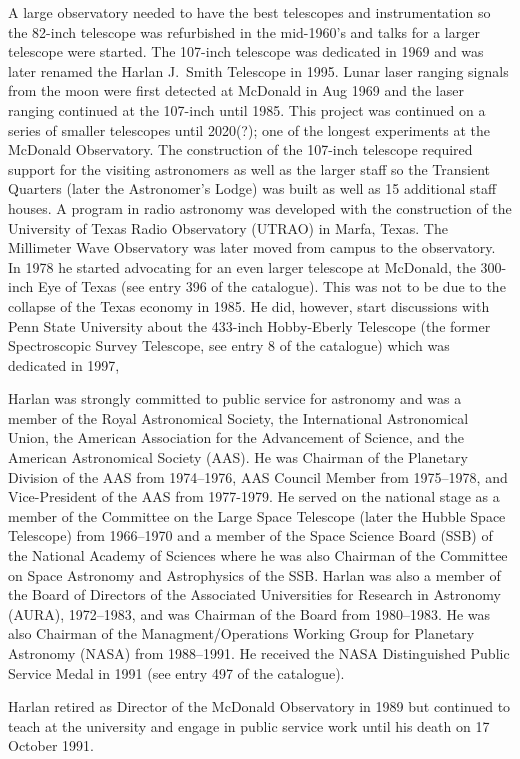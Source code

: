 A large observatory needed to have the best telescopes and
instrumentation so the 82-inch telescope was refurbished in the
mid-1960's and talks for a larger telescope were started.  The
107-inch telescope was dedicated in 1969 and was later renamed the
Harlan J.~Smith Telescope in 1995. Lunar laser ranging signals from
the moon were first detected at McDonald in Aug 1969 and the laser
ranging continued at the 107-inch until 1985. This project was
continued on a series of smaller telescopes until 2020(?);
one of the longest experiments at the McDonald Observatory. The
construction of the 107-inch telescope required support for the
visiting astronomers as well as the larger staff so the Transient
Quarters (later the Astronomer's Lodge) was built as well as 15
additional staff houses. A program in radio astronomy was developed
with the construction of the University of Texas Radio Observatory
(UTRAO) in Marfa, Texas. The Millimeter Wave Observatory was later
moved from campus to the observatory. In 1978 he started advocating
for an even larger telescope at McDonald, the 300-inch Eye of Texas
(see entry 396 of the catalogue). This was not to be due to the
collapse of the Texas economy in 1985. He did, however, start
discussions with Penn State University about the 433-inch Hobby-Eberly
Telescope (the former Spectroscopic Survey Telescope, see entry 8 of
the catalogue) which was dedicated in 1997,

Harlan was strongly committed to public service for astronomy and was
a member of the Royal Astronomical Society, the International
Astronomical Union, the American Association for the Advancement of
Science, and the American Astronomical Society (AAS). He was Chairman of the
Planetary Division of the AAS from 1974--1976, AAS Council Member from
1975--1978, and Vice-President of the AAS from 1977-1979. He served on
the national stage as a member of the Committee on the Large Space
Telescope (later the Hubble Space Telescope) from 1966--1970 and a
member of the Space Science Board (SSB) of the National Academy of
Sciences where he was also Chairman of the Committee on Space
Astronomy and Astrophysics of the SSB. Harlan was also a member of the
Board of Directors of the Associated Universities for Research in
Astronomy (AURA), 1972--1983, and was Chairman of the Board from
1980--1983. He was also Chairman of the Managment/Operations Working
Group for Planetary Astronomy (NASA) from 1988--1991.  He received
the NASA Distinguished Public Service Medal in 1991 (see entry 497 of
the catalogue).

Harlan retired as Director of the McDonald Observatory in 1989 but
continued to teach at the university and engage in public service work
until his death on 17 October 1991.


